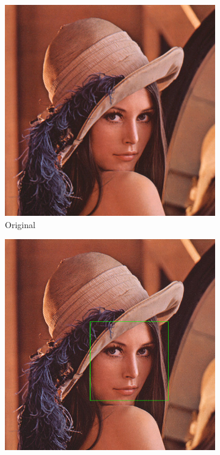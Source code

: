 \documentclass[a4paper, 12pt]{book}
\begin{document}
\begin{figure}[!ht]
    \centering
    \begin{subfigure}[b]{0.3\textwidth}
        \includegraphics[width=\textwidth]{lena}
        \caption{Original}
    \end{subfigure}
    \begin{subfigure}[b]{0.3\textwidth}
        \includegraphics[width=\textwidth]{lena_opencv_face}

\end{subfigure}
\end{figure}
\end{document}
